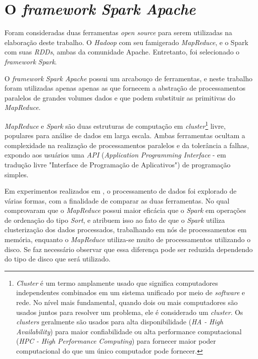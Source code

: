 \section{O \textit{framework Spark Apache}}

Foram consideradas duas ferramentas \textit{open source} para serem utilizadas na elaboração deste trabalho. O \textit{Hadoop} com seu famigerado \textit{MapReduce}, e o Spark com suas \textit{RDDs}, ambas da comunidade Apache. Entretanto, foi selecionado o \textit{framework} \textit{Spark}.

O \textit{framework}\textit{ Spark Apache} possui um arcabouço de ferramentas, e neste trabalho foram utilizadas apenas apenas  as que fornecem a abstração de processamentos paralelos de grandes volumes dados e que podem substituir as primitivas do \textit{MapReduce}.

\textit{MapReduce} e \textit{Spark} são duas estruturas de computação em \textit{cluster}\footnote{\textit{Cluster} é um termo amplamente usado que significa computadores independentes combinados em um sistema unificado por meio de \textit{software} e rede. No nível mais fundamental, quando dois ou mais computadores são usados juntos para resolver um problema, ele é considerado um \textit{cluster}. Os \textit{clusters} geralmente são usados para alta disponibilidade (\textit{HA - High Availability}) para maior confiabilidade ou alta performance computacional (\textit{HPC -  High Performance Computing}) para fornecer maior poder computacional do que um único computador pode fornecer.\cite{1401797-Cluster}} livre, populares para análise de dados em larga escala. Ambas ferramentas ocultam a complexidade na realização de processamentos paralelos e da tolerância a falhas, expondo aos usuários uma \textit{API} (\textit{Application Programming Interface} - em tradução livre "Interface de Programação de Aplicativos") de programação simples. 

Em experimentos realizados em \cite{MpReVsSpark}, o processamento de dados foi explorado de várias formas, com a finalidade de comparar as duas ferramentas. No qual comprovaram que o \textit{MapReduce} possui maior eficácia que o \textit{Spark} em operações de ordenação do tipo \textit{Sort}, e \cite{MpReVsSpark} atribuem isso ao fato de que o \textit{Spark} utiliza clusterização dos dados processados, trabalhando em nós de processamentos em memória, enquanto o \textit{MapReduce} utiliza-se muito de processamentos utilizando o disco. Se faz necessário observar que essa diferença pode ser reduzida dependendo do tipo de disco que será utilizado.

